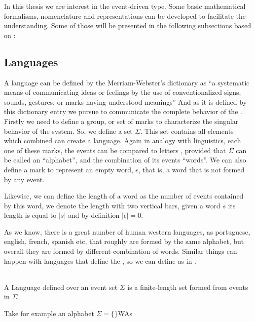 In this thesis we are interest in the event-driven type. Some basic mathematical
formalisms, nomenclature and representations can be
developed to facilitate the understanding. Some of those will be presented in
the following subsections based on \cite{cassandras2009introduction}:
\subsection{Languages}
\label{sec:automata}
A language can be defined by the Merriam-Webster's dictionary as ``a systematic means of communicating ideas or feelings by the use of conventionalized signs, sounds, gestures, or marks having understood meanings''
And as it is defined by this dictionary entry we pursue to communicate the complete
behavior of the \DES.
Firstly we need to define a group, or
set of marks to characterize the singular behavior of the system.
So, we define a
set $\Sigma$. This set contains all elements which combined can create a language.
Again in analogy with linguistics, each one of these marks, the events can be
compared to
letters
, provided that $\Sigma$ can be called an ``alphabet'', and the combination of
its events ``words''. We can also define a mark to represent an empty word,
$\epsilon$, that is, a word that is not formed by any event.

Likewise, we can define the length of a word as the number of events contained by
this word, we denote the length with two vertical bars, given a word $s$ its
length is equal to $|s|$ and by definition $|\epsilon| = 0 $.

As we know, there is a great number of human western languages, as portuguese, english,
french, spanish etc, that roughly are formed by the same alphabet, but overall
they are formed by different combination of words.  
Similar things can happen with languages that define the \DESs, so we can define
as in \cite{cassandras2009introduction}.

\begin{definition}[Language]
\label{def:language}~\\  
A Language defined over an event set $\Sigma$ is a finite-length set formed from
events in $\Sigma$
\end{definition}

Take for example an alphabet $\Sigma = \{\}$WAs
